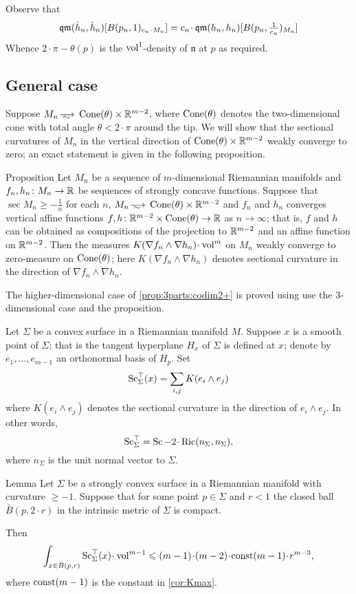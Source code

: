 Observe that 
\[\qm(\hat h_n, \hat h_n)[B(p_n,1)_{c_n\cdot M_n}]
=
c_n\cdot \qm(h_n, h_n)[B(p_n,\tfrac1{c_n})_{M_n}]\]
Whence $2\cdot \pi-\theta(p)$ is the $\operatorname{vol}^1$-density of $\mathfrak n$ at $p$ as required.
\qeds

\subsection{General case}


Suppose $M_n\smooths{} \Cone(\theta)\times \RR^{m-2}$, where $\operatorname{Cone}(\theta)$ denotes the two-dimensional cone with total angle $\theta<2\cdot\pi$ around the tip.
We will show that the sectional curvatures of $M_n$ in the vertical direction of $\operatorname{Cone}(\theta)\times \mathbb{R}^{m-2}$ weakly converge to zero;
an exact statement is given in the following proposition.

\begin{thm}{Proposition}\label{prop:vert-vert}
Let $M_n$ be a sequence of $m$-dimensional Riemannian manifolds
and $f_n,h_n\colon M_n\to \mathbb{R}$ be sequences of strongly concave functions.
Suppose that $\sec M_n\ge -\tfrac1n$ for each $n$, $M_n\smooths{} \Cone(\theta)\times\RR^{m-2} $ and $f_n$ and $h_n$ converges vertical affine functions  $f,h\colon\mathbb{R}^{m-2}\times \operatorname{Cone}(\theta)\to \mathbb{R}$ as $n\to \infty$; that is, $f$ and $h$ can be obtained as compositions of the projection to $\mathbb{R}^{m-2}$ and an affine function on $\mathbb{R}^{m-2}$.
Then the measures $K(\nabla f_n\wedge\nabla h_n)\cdot\vol^m$ on $M_n$ weakly converge to zero-measure on $\operatorname{Cone}(\theta)$;
here $K(\nabla f_n\wedge\nabla h_n)$ denotes sectional curvature in the direction of $\nabla f_n\wedge\nabla h_n$.
\end{thm}

The higher-dimensional case of \ref{prop:3parts:codim2+} is proved using use the 3-dimensional case and the proposition.

Let $\Sigma$ be a convex surface in a Riemannian manifold $M$.
Suppose $x$ is a smooth point of $\Sigma$; that is the tangent hyperplane $H_x$ of $\Sigma$ is defined at $x$;
denote by $e_1,\dots,e_{m-1}$ an orthonormal basis of $H_p$.
Set 
\[\operatorname{\rm Sc}^\top_\Sigma(x)= \sum_{i,j} K(e_i\wedge e_j)\]
where $K(e_i\wedge e_j)$ denotes the sectional curvature in the direction of $e_i\wedge e_j$.
In other words, 
\[\Sc^\top_\Sigma=\Sc-2\cdot\Ric(n_\Sigma,n_\Sigma),\]
where $n_\Sigma$ is the unit normal vector to $\Sigma$.

\begin{thm}{Lemma}\label{lem:nonsmooth-convex}
Let $\Sigma$ be a strongly convex surface in a Riemannian manifold with curvature $\ge -1$.
Suppose that for some point $p\in \Sigma$ and $r<1$ the closed ball $\bar B(p,2\cdot r)$ in the intrinsic metric of $\Sigma$ is compact.

Then 
\[\int_{x\in B(p,r)}\Sc^\top_\Sigma(x)\cdot \vol^{m-1}\le (m-1)\cdot(m-2)\cdot\const(m-1)\cdot r^{m-3},\]
where $\mathrm{const}(m-1)$ is the constant in \ref{cor:Kmax}.
\end{thm}

